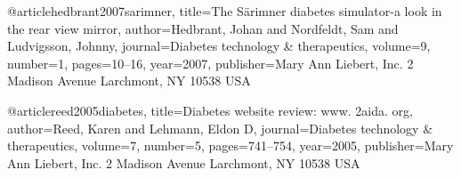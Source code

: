 
@article{hedbrant2007sarimner,
  title={The S{\"a}rimner diabetes simulator-a look in the rear view mirror},
  author={Hedbrant, Johan and Nordfeldt, Sam and Ludvigsson, Johnny},
  journal={Diabetes technology \& therapeutics},
  volume={9},
  number={1},
  pages={10--16},
  year={2007},
  publisher={Mary Ann Liebert, Inc. 2 Madison Avenue Larchmont, NY 10538 USA}
}




@article{reed2005diabetes,
  title={Diabetes website review: www. 2aida. org},
  author={Reed, Karen and Lehmann, Eldon D},
  journal={Diabetes technology \& therapeutics},
  volume={7},
  number={5},
  pages={741--754},
  year={2005},
  publisher={Mary Ann Liebert, Inc. 2 Madison Avenue Larchmont, NY 10538 USA}
}